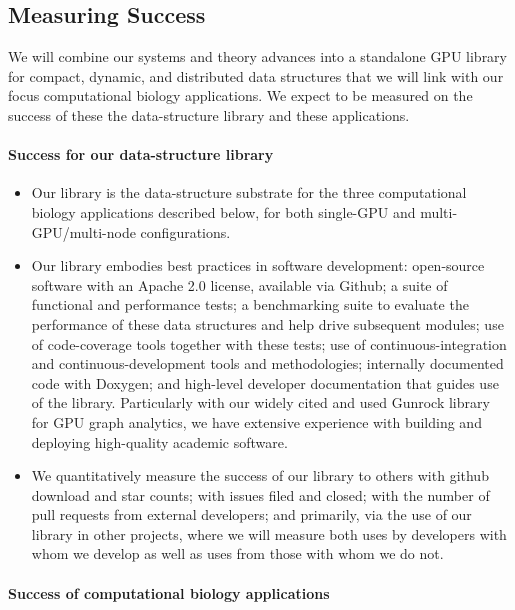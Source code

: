 \subsection{Measuring Success} We will combine our systems and theory advances into a standalone GPU library for compact, dynamic, and distributed data structures that we will link with our focus computational biology applications. We expect to be measured on the success of these the data-structure library and these applications.

\noindent
\paragraph{Success for our data-structure library}

\label{sec:sw-methodology}

\begin{itemize}[noitemsep]
  \item Our library is the data-structure substrate for the three computational biology applications described below, for both single-GPU and multi-GPU/multi-node configurations.
  \item Our library embodies best practices in software development: open-source software with an Apache 2.0 license, available via Github; a suite of functional and performance tests; a benchmarking suite to evaluate the performance of these data structures and help drive subsequent modules; use of code-coverage tools together with these tests; use of continuous-integration and continuous-development tools and methodologies; internally documented code with Doxygen; and high-level developer documentation that guides use of the library. Particularly with our widely cited and used Gunrock library~\cite{Wang:2017:GGG} for GPU graph analytics, we have extensive experience with building and deploying high-quality academic software.
  \item We quantitatively measure the success of our library to others with github download and star counts; with issues filed and closed; with the number of pull requests from external developers; and primarily, via the use of our library in other projects, where we will measure both uses by developers with whom we develop as well as uses from those with whom we do not.
\end{itemize}

\paragraph{Success of computational biology applications}

